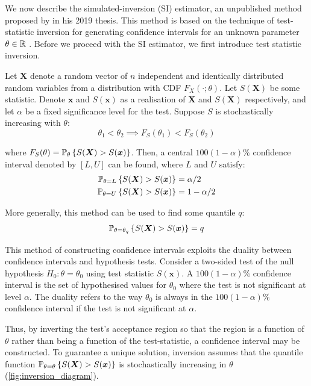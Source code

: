We now describe the simulated-inversion (SI) estimator, an unpublished method proposed by \citet{Huang2019} in his 2019 thesis. This method is based on the technique of test-statistic inversion for generating confidence intervals for an unknown parameter $\theta \in \mathbb{R}$ \cite{Carpenter1999}. Before we proceed with the SI estimator, we first introduce test statistic inversion.

Let $\bm{X}$ denote a random vector of $n$ independent and identically distributed random variables from a distribution with CDF $F_X (\cdot; \theta)$. Let $S(\bm{X})$ be some statistic. Denote $\bm{x}$ and $S(\bm{x})$ as a realisation of $\bm{X}$ and $S(\bm{X})$ respectively, and let $\alpha$ be a fixed significance level for the test. Suppose $S$ is stochastically increasing with $\theta$:
\begin{equation}
    \theta_1 < \theta_2 \implies F_S(\theta_1) < F_S(\theta_2) 
\end{equation}

where $F_S(\theta) = \mathbb{P}_\theta\left\{S(\bm{X}) > S(\bm{x})\right\}$. Then, a central $100(1-\alpha)\%$ confidence interval denoted by $[L, U]$ can be found, where $L$ and $U$ satisfy: \begin{equation}
\begin{aligned}
    \mathbb{P}_{\theta = L}\left\{S(\bm{X}) > S(\bm{x})\right\} &= \alpha/2 \\
    \mathbb{P}_{\theta = U}\left\{S(\bm{X}) > S(\bm{x})\right\} &= 1 - \alpha/2
\end{aligned}
\end{equation}

More generally, this method can be used to find some quantile $q$: \begin{equation}\label{eq: inversion}
    \mathbb{P}_{\theta = \theta_q}\left\{S(\bm{X}) > S(\bm{x})\right\} = q
\end{equation}

This method of constructing confidence intervals exploits the duality between confidence intervals and hypothesis tests. Consider a two-sided test of the null hypothesis $H_0: \theta = \theta_0$ using test statistic $S(\bm{x})$. A $100(1-\alpha)\%$ confidence interval is the set of hypothesised values for $\theta_0$ where the test is not significant at level $\alpha$. The duality refers to the way $\theta_0$ is always in the $100(1-\alpha)\%$ confidence interval if the test is not significant at $\alpha$.

Thus, by inverting the test's acceptance region so that the region is a function of $\theta$ rather than being a function of the test-statistic, a confidence interval may be constructed. To guarantee a unique solution, inversion assumes that the quantile function $\mathbb{P}_{\theta = \theta}\left\{S(\bm{X}) > S(\bm{x})\right\}$ is stochastically increasing in $\theta$ (\autoref{fig:inversion_diagram}).

